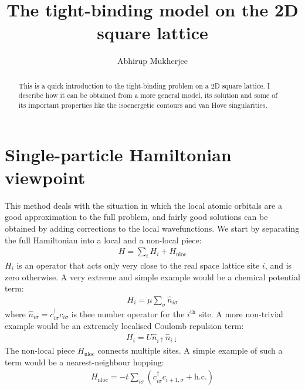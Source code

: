 \documentclass[12pt,onecolumn]{revtex4-2}
\begin{document}
\title{\bf The tight-binding model on the 2D square lattice}
\author{Abhirup Mukherjee}
\begin{abstract}
This is a quick introduction to the tight-binding problem on a 2D square lattice. I describe how it can be obtained from a more general model, its solution and some of its important properties like the isoenergetic contours and van Hove singularities.
\end{abstract}
\maketitle

\section{Single-particle Hamiltonian viewpoint}
This method deals with the situation in which the local atomic orbitals are a good approximation to the full problem, and fairly good solutions can be obtained by adding corrections to the local wavefunctions. We start by separating the full Hamiltonian into a local and a non-local piece:
\begin{equation}\begin{aligned}
	H = \sum_i H_i + H_\text{nloc}
\end{aligned}\end{equation}
$H_i$ is an operator that acts only very close to the real space lattice site \(i\), and is zero otherwise. A very extreme and simple example would be a chemical potential term:
\begin{equation}\begin{aligned}
	H_i = \mu \sum_{\sigma} \hat n_{i\sigma}
\end{aligned}\end{equation}
where \(\hat n_{i\sigma} = c^\dagger_{i \sigma}c_{i \sigma}\) is thee number operator for the $i^\text{th}$ site.
A more non-trivial example would be an extremely localised Coulomb repulsion term:
\begin{equation}\begin{aligned}
	H_i =  U\hat n_{i \uparrow}\hat n_{i \downarrow}
\end{aligned}\end{equation}
The non-local piece $H_\text{nloc}$ connects multiple sites. A simple example of such a term would be a nearest-neighbour hopping:
\begin{equation}\begin{aligned}
	H_\text{nloc} =  -t\sum_{i\sigma} \left(c^\dagger_{i\sigma}c_{i+1,\sigma} + \text{h.c.}\right)
\end{aligned}\end{equation}
\end{document}

